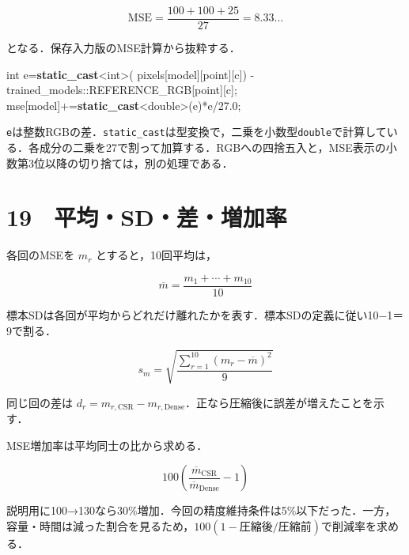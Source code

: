\documentclass[
  14pt,
  a5paper,
]{extarticle}
\newenvironment{Shaded}{}{}
\newcommand{\DataTypeTok}[1]{\textcolor[rgb]{0.56,0.13,0.00}{#1}}
\newcommand{\FloatTok}[1]{\textcolor[rgb]{0.25,0.63,0.44}{#1}}
\newcommand{\KeywordTok}[1]{\textcolor[rgb]{0.00,0.44,0.13}{\textbf{#1}}}
\newcommand{\NormalTok}[1]{#1}
\newcommand{\OperatorTok}[1]{\textcolor[rgb]{0.40,0.40,0.40}{#1}}
\begin{document}
\[\mathrm{MSE}=\frac{100+100+25}{27}=8.33\ldots\]

となる．保存入力版のMSE計算から抜粋する．

\begin{Shaded}
\begin{Highlighting}[]
\DataTypeTok{int}\NormalTok{ e}\OperatorTok{=}\KeywordTok{static\_cast}\OperatorTok{\textless{}}\DataTypeTok{int}\OperatorTok{\textgreater{}(}
\NormalTok{  pixels}\OperatorTok{[}\NormalTok{model}\OperatorTok{][}\NormalTok{point}\OperatorTok{][}\NormalTok{c}\OperatorTok{])}
  \OperatorTok{{-}}\NormalTok{trained\_models}\OperatorTok{::}\NormalTok{REFERENCE\_RGB}\OperatorTok{[}\NormalTok{point}\OperatorTok{][}\NormalTok{c}\OperatorTok{];}
\NormalTok{mse}\OperatorTok{[}\NormalTok{model}\OperatorTok{]+=}\KeywordTok{static\_cast}\OperatorTok{\textless{}}\DataTypeTok{double}\OperatorTok{\textgreater{}(}\NormalTok{e}\OperatorTok{)*}\NormalTok{e}\OperatorTok{/}\FloatTok{27.0}\OperatorTok{;}
\end{Highlighting}
\end{Shaded}

\texttt{e}は整数RGBの差．\texttt{static\_cast}は型変換で，二乗を小数型\texttt{double}で計算している．各成分の二乗を27で割って加算する．RGBへの四捨五入と，MSE表示の小数第3位以降の切り捨ては，別の処理である．

\newpage

\section{19　平均・SD・差・増加率}\label{ux5e73ux5747sdux5deeux5897ux52a0ux7387}

各回のMSEを \(m_r\) とすると，10回平均は，

\[\overline m=\frac{m_1+\cdots+m_{10}}{10}\]

標本SDは各回が平均からどれだけ離れたかを表す．標本SDの定義に従い10−1＝9で割る．

\[s_m=\sqrt{\frac{\sum_{r=1}^{10}(m_r-\overline m)^2}{9}}\]

同じ回の差は
\(d_r=m_{r,\mathrm{CSR}}-m_{r,\mathrm{Dense}}\)．正なら圧縮後に誤差が増えたことを示す．

MSE増加率は平均同士の比から求める．

\[100\left(\frac{\overline m_{\mathrm{CSR}}}{\overline m_{\mathrm{Dense}}}-1\right)\]

説明用に100→130なら30\%増加．今回の精度維持条件は5\%以下だった．一方，容量・時間は減った割合を見るため，\(100(1-\text{圧縮後}/\text{圧縮前})\)で削減率を求める．
\end{document}
